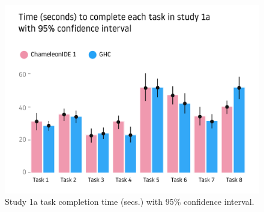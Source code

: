 



\begin{figure}
    \centering
    \includegraphics[width=0.8\linewidth,trim=15mm 12mm 15mm 35mm,clip]{images/user-study-1a.pdf}
    \caption{Study 1a task completion time (secs.) with 95\% confidence interval.}
    \label{fig:analysis-1a}
\end{figure}



